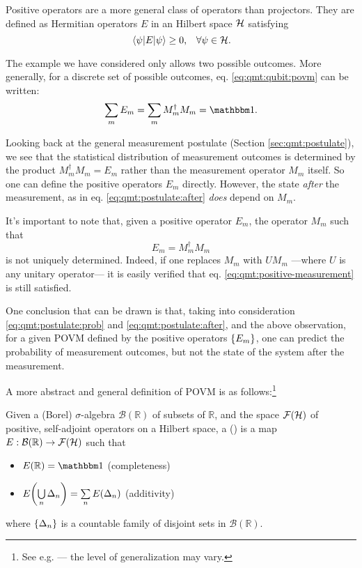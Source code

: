 Positive operators are a more general class of operators than projectors.
They are defined as Hermitian operators $E$ in an Hilbert space $\mathcal{H}$ satisfying
\[
  \ev{E}{\psi} \ge 0 \text{,}\quad \forall \psi \in \hilb{H}.
\]

The example we have considered only allows two possible outcomes.
More generally, for a discrete set of possible outcomes, 
eq. \eqref{eq:qmt:qubit:povm} can be written:
\begin{equation}
  \sum_m E_m = \sum_m M_m^{\dagger} M_m = \idop \text{.}
\end{equation}

Looking back at the general measurement postulate (Section \ref{sec:qmt:postulate}),
we see that the statistical distribution of measurement outcomes
is determined by the product $M_m^{\dagger} M_m = E_m$ rather than the
measurement operator $M_m$ itself. So one can define the positive operators $E_m$ directly.
However, the state \emph{after} the measurement, as in eq. \eqref{eq:qmt:postulate:after}
\emph{does} depend on $M_m$.

It's important to note that, given a positive operator $E_m$, the operator
$M_m$ such that
\begin{equation}\label{eq:qmt:positive-measurement}
  E_m = M_{m}^{\dagger} M_m
\end{equation}
is not uniquely determined. 
Indeed, if one replaces $M_m$ with $UM_m$
---where $U$ is any unitary operator---
it is easily verified that
eq. \eqref{eq:qmt:positive-measurement} is still satisfied.

One conclusion that can be drawn is that,
taking into consideration \eqref{eq:qmt:postulate:prob} and
\eqref{eq:qmt:postulate:after}, and the above observation,
for a  given POVM defined by the positive operators $\left\{E_m\right\}$,
one can predict the probability of measurement outcomes,
but not the state of the system after the measurement.

A more abstract and general definition of POVM is as
follows:\footnote{
  See e.g. \cite{BeneduciPhD, Berberian} --- the level of generalization may vary.
}
\begin{definition}
  Given a (Borel) $\sigma$-algebra $\mathcal{B}(\mathbb{R})$ of subsets of $\mathbb{R}$,
  and the space $\mathcal{F}(\mathcal{H})$ of positive, self-adjoint operators on a Hilbert space,
  a  ()
  is a map $E: \mathcal{B}(\mathbb{R}) \rightarrow \mathcal{F}(\mathcal{H})$
  such that
  \begin{itemize}
    \item $E(\mathbb{R}) = \idop$ (completeness)
    \item $E\qty(\bigcup\limits_{n} \Delta_n) = \sum\limits_{n} E\qty(\Delta_n)$ (additivity) 
  \end{itemize}
  where $\left\{\Delta_n\right\}$ is a countable family of disjoint sets in
  $\mathcal{B}(\mathbb{R})$.
\end{definition}
